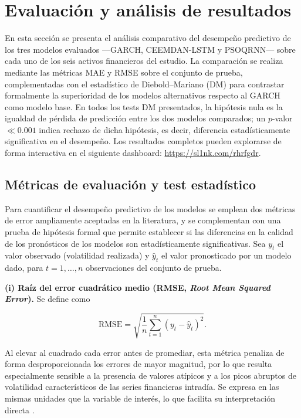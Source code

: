 \documentclass[12pt]{paper}
\begin{document}
\section{Evaluación y análisis de resultados}
\label{sec:evaluacion}

En esta sección se presenta el análisis comparativo del desempeño predictivo de los tres modelos evaluados ---GARCH, CEEMDAN-LSTM y PSOQRNN--- sobre cada uno de los seis activos financieros del estudio. La comparación se realiza mediante las métricas MAE y RMSE sobre el conjunto de prueba, complementadas con el estadístico de Diebold--Mariano (DM) para contrastar formalmente la superioridad de los modelos alternativos respecto al GARCH como modelo base. En todos los tests DM presentados, la hipótesis nula es la igualdad de pérdida de predicción entre los dos modelos comparados; un $p$-valor $\ll 0.001$ indica rechazo de dicha hipótesis, es decir, diferencia estadísticamente significativa en el desempeño. Los resultados completos pueden explorarse de forma interactiva en el siguiente dashboard: \url{https://sl1nk.com/rhrfgdr}.

\subsection{Métricas de evaluación y test estadístico}

Para cuantificar el desempeño predictivo de los modelos se emplean dos métricas de error ampliamente aceptadas en la literatura, y se complementan con una prueba de hipótesis formal que permite establecer si las diferencias en la calidad de los pronósticos de los modelos son estadísticamente significativas. Sea $y_t$ el valor observado (volatilidad realizada) y $\hat{y}_t$ el valor pronosticado por un modelo dado, para $t = 1, \ldots, n$ observaciones del conjunto de prueba.

\textbf{(i) Raíz del error cuadrático medio (RMSE, \textit{Root Mean Squared Error}).} Se define como

\begin{equation}
    \text{RMSE} = \sqrt{\frac{1}{n}\sum_{t=1}^{n}\left(y_t - \hat{y}_t\right)^2}.
\end{equation}

Al elevar al cuadrado cada error antes de promediar, esta métrica penaliza de forma desproporcionada los errores de mayor magnitud, por lo que resulta especialmente sensible a la presencia de valores atípicos y a los picos abruptos de volatilidad característicos de las series financieras intradía. Se expresa en las mismas unidades que la variable de interés, lo que facilita su interpretación directa \cite{chai2014root}.
\end{document}
